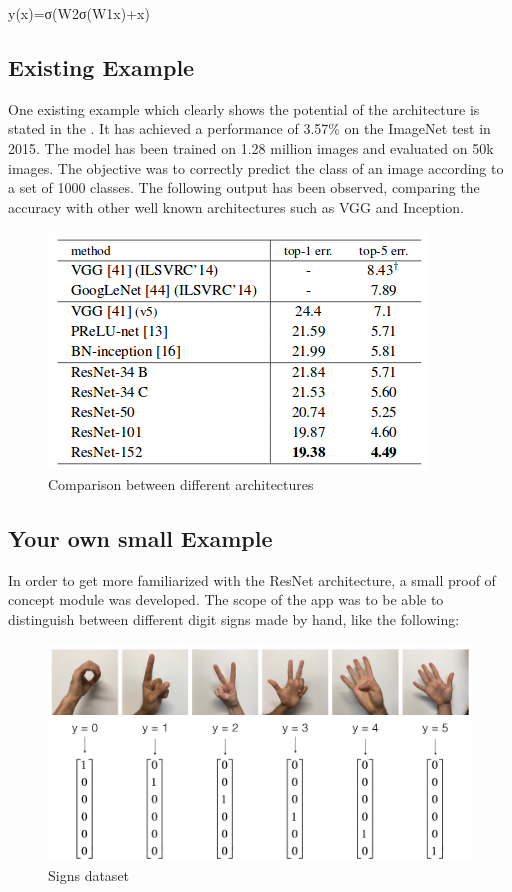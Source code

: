 \documentclass[a4paper,11pt]{article}
\begin{document}
	                                y(x)=σ(W2σ(W1x)+x)
	 
 \subsection{Existing Example}
	 One existing example which clearly shows the potential of the architecture is stated in the \cite{resnet}. It has achieved a performance of 3.57\% on the ImageNet test in 2015. The model has been trained on 1.28 million images and evaluated on 50k images. The objective was to correctly predict the class of an image according to a set of 1000 classes. The following output has been observed, comparing the accuracy with other well known architectures such as VGG and Inception. 
	 \begin{figure}[H]
	\includegraphics[width = \textwidth]{resnetError.png}
	\caption{Comparison between different architectures}
	 \end{figure}
	 

 \subsection{Your own small Example}
	In order to get more familiarized with the ResNet architecture, a small proof of concept module was developed. The scope of the app was to be able to distinguish between different digit signs made by hand, like the following:
	\begin{figure}[H]
		\includegraphics[width = \textwidth]{signs.png}
		\caption{Signs dataset}
	\end{figure}
    
\end{document}
